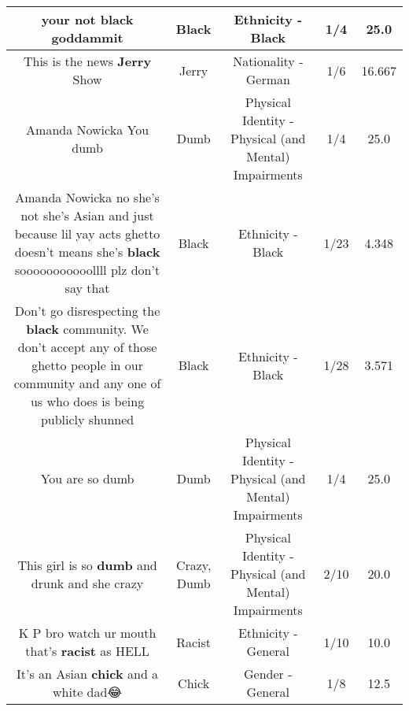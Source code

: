 \documentclass[11pt]{article}
\newlength\mylength
\begin{document}
\begin{center}
\begin{longtable}{|C{.65\mylength}|C{.30\mylength}|C{.12\mylength}|C{.12\mylength}|C{.12\mylength}|}
  \small your not \textbf{black} goddammit\normalsize   & Black & Ethnicity - Black & 1/4 & 25.0 \\  \hline
  \small This is the news \textbf{Jerry} Show\normalsize   & Jerry & Nationality - German & 1/6 & 16.667 \\  \hline
  \small Amanda Nowicka You dumb\normalsize   & Dumb & Physical Identity - Physical (and Mental) Impairments & 1/4 & 25.0 \\  \hline
  \small Amanda Nowicka no she's not she's Asian and just because lil yay acts ghetto doesn't means she's \textbf{black} sooooooooooollll plz don't say that\normalsize   & Black & Ethnicity - Black & 1/23 & 4.348 \\  \hline
  \small Don't go disrespecting the \textbf{black} community. We don't accept any of those ghetto people in our community and any one of us who does is being publicly shunned\normalsize   & Black & Ethnicity - Black & 1/28 & 3.571 \\  \hline
  \small You are so dumb\normalsize   & Dumb & Physical Identity - Physical (and Mental) Impairments & 1/4 & 25.0 \\  \hline
  \small This girl is so \textbf{dumb} and drunk and she crazy\normalsize   & Crazy, Dumb & Physical Identity - Physical (and Mental) Impairments & 2/10 & 20.0 \\  \hline
  \small K P bro watch ur mouth that's \textbf{racist} as HELL\normalsize   & Racist & Ethnicity - General & 1/10 & 10.0 \\  \hline
  \small It's an Asian \textbf{chick} and a white dad😂\normalsize   & Chick & Gender - General & 1/8 & 12.5 \\  \hline

\end{longtable}
\end{center}
\end{document}
